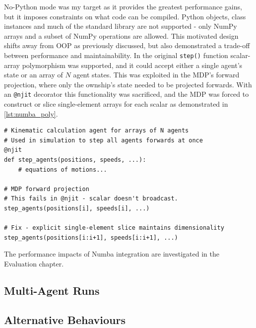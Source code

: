 No-Python mode was my target as it provides the greatest performance gains, but it imposes constraints on what code can be compiled. Python objects, class instances and much of the standard library are not supported - only NumPy arrays and a subset of NumPy operations are allowed. This motivated design shifts away from OOP as previously discussed, but also demonstrated a trade-off between performance and maintainability. In the original \texttt{step()} function scalar-array polymorphism was supported, and it could accept either a single agent's state or an array of $N$ agent states. This was exploited in the MDP's forward projection, where only the ownship's state needed to be projected forwards. With an \texttt{@njit} decorator this functionality was sacrificed, and the MDP was forced to construct or slice single-element arrays for each scalar as demonstrated in \cref{lst:numba_poly}.

\begin{listing}[H]
\begin{verbatim}
# Kinematic calculation agent for arrays of N agents
# Used in simulation to step all agents forwards at once
@njit
def step_agents(positions, speeds, ...):
    # equations of motions...

# MDP forward projection
# This fails in @njit - scalar doesn't broadcast.
step_agents(positions[i], speeds[i], ...)

# Fix - explicit single-element slice maintains dimensionality
step_agents(positions[i:i+1], speeds[i:i+1], ...)
\end{verbatim}
\caption{Scalar-array polymorphism trade-off for \texttt{@njit} broadcasting consistency.}
\label{lst:numba_poly}
\end{listing}

The performance impacts of Numba integration are investigated in the Evaluation chapter.

\subsection{Multi-Agent Runs}
\label{sec:3.5.2}

\subsection{Alternative Behaviours}
\label{sec:3.5.3}

